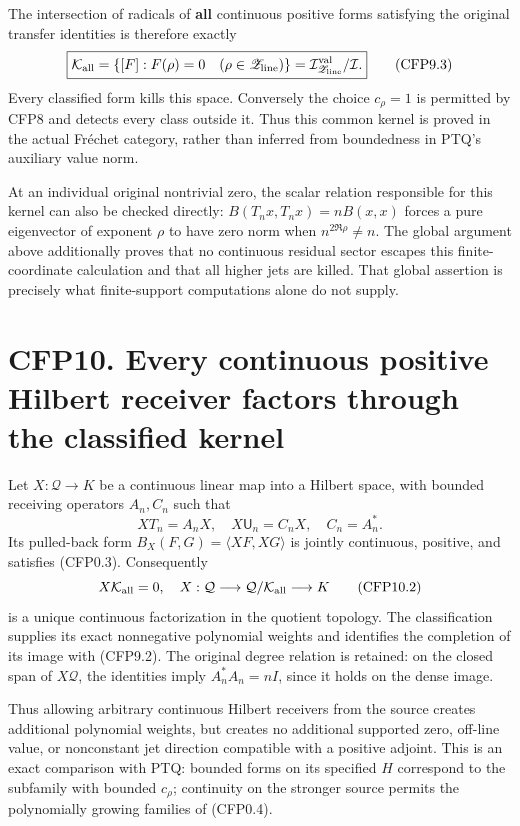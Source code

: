 The intersection of radicals of \textbf{all} continuous positive forms
satisfying the original transfer identities is therefore exactly \[
\boxed{\mathcal K_{\rm all}
=\{[F]:F(\rho)=0\quad(\rho\in\mathscr Z_{\rm line})\}
=\mathcal I_{\mathscr Z_{\rm line}}^{\rm val}/\mathcal I.}
\tag{CFP9.3}
\] Every classified form kills this space. Conversely the choice
\(c_\rho=1\) is permitted by CFP8 and detects every class outside it.
Thus this common kernel is proved in the actual Fréchet category, rather
than inferred from boundedness in PTQ's auxiliary value norm.

At an individual original nontrivial zero, the scalar relation
responsible for this kernel can also be checked directly:
\(B(T_nx,T_nx)=nB(x,x)\) forces a pure eigenvector of exponent \(\rho\)
to have zero norm when \(n^{2\Re\rho}\ne n\). The global argument above
additionally proves that no continuous residual sector escapes this
finite-coordinate calculation and that all higher jets are killed. That
global assertion is precisely what finite-support computations alone do
not supply.

\section{CFP10. Every continuous positive Hilbert receiver factors
through the classified
kernel}\label{cfp10.-every-continuous-positive-hilbert-receiver-factors-through-the-classified-kernel}

Let \(X:\mathcal Q\to K\) be a continuous linear map into a Hilbert
space, with bounded receiving operators \(A_n,C_n\) such that \[
XT_n=A_nX,\quad X\mathsf U_n=C_nX,\quad C_n=A_n^*.
\tag{CFP10.1}
\] Its pulled-back form \(B_X(F,G)=\langle XF,XG\rangle\) is jointly
continuous, positive, and satisfies (CFP0.3). Consequently \[
X\mathcal K_{\rm all}=0,
\quad X:\mathcal Q\longrightarrow\mathcal Q/\mathcal K_{\rm all}
\longrightarrow K
\tag{CFP10.2}
\] is a unique continuous factorization in the quotient topology. The
classification supplies its exact nonnegative polynomial weights and
identifies the completion of its image with (CFP9.2). The original
degree relation is retained: on the closed span of \(X\mathcal Q\), the
identities imply \(A_n^*A_n=nI\), since it holds on the dense image.

Thus allowing arbitrary continuous Hilbert receivers from the source
creates additional polynomial weights, but creates no additional
supported zero, off-line value, or nonconstant jet direction compatible
with a positive adjoint. This is an exact comparison with PTQ: bounded
forms on its specified \(H\) correspond to the subfamily with bounded
\(c_\rho\); continuity on the stronger source permits the polynomially
growing families of (CFP0.4).

